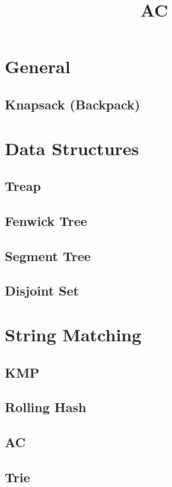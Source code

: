 \documentclass[10pt,a4paper,twocolumn]{extarticle}
\begin{document}
\title{AC}

\renewcommand\cftsecleader{\cftdotfill{\cftdotsep}}
\tableofcontents

\section{General}
	\subsection{Knapsack (Backpack)}

\section{Data Structures}
	\subsection{Treap}
    	
    \subsection{Fenwick Tree}
    	
    \subsection{Segment Tree}
    	
	\subsection{Disjoint Set}
		

\section{String Matching}
	\subsection{KMP}
		
    \subsection{Rolling Hash}
		
    \subsection{AC}
    \subsection{Trie}
\end{document}
